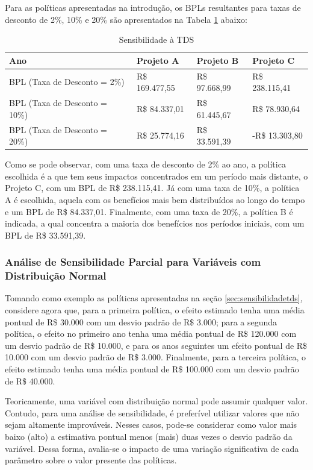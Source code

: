 \documentclass[12pt,letterpaper]{article}
\newcommand{\1}{\mathbbm{1}}
\numberwithin{equation}{section}
\begin{document}
Para as políticas apresentadas na introdução, os BPLs resultantes para taxas de desconto de 2\%, 10\% e 20\% são apresentados na Tabela \ref{tab:sensibilidadetds} abaixo:

\begin{table}[htbp]
  \centering
  \caption{Sensibilidade à TDS}
    \begin{tabular}{|l|l|l|l|}
    \toprule
    Ano   & Projeto A & Projeto B & Projeto C \\
    \midrule
    BPL (Taxa de Desconto = 2\%) &  R\$  169.477,55  &  R\$    97.668,99  &  R\$  238.115,41  \\
    \midrule
    BPL (Taxa de Desconto = 10\%) &  R\$    84.337,01  &  R\$    61.445,67  &  R\$    78.930,64  \\
    \midrule
    BPL (Taxa de Desconto = 20\%) &  R\$    25.774,16  &  R\$    33.591,39  & -R\$    13.303,80  \\
    \bottomrule
    \end{tabular}%
  \label{tab:sensibilidadetds}%
\end{table}%

Como se pode observar, com uma taxa de desconto de 2\% ao ano, a política escolhida é a que tem seus impactos concentrados em um período mais distante, o Projeto C, com um BPL de R\$ 238.115,41. Já com uma taxa de 10\%, a política A é escolhida, aquela com os benefícios mais bem distribuídos ao longo do tempo e um BPL de R\$ 84.337,01. Finalmente, com uma taxa de 20\%, a política B é indicada, a qual concentra a maioria dos benefícios nos períodos iniciais, com um BPL de R\$ 33.591,39.

\subsubsection{Análise de Sensibilidade Parcial para Variáveis com Distribuição Normal}

Tomando como exemplo as políticas apresentadas na seção \ref{sec:sensibilidadetds}, considere agora que, para a primeira política, o efeito estimado tenha uma média pontual de R\$ 30.000 com um desvio padrão de R\$ 3.000; para a segunda política, o efeito no primeiro ano tenha uma média pontual de R\$ 120.000 com um desvio padrão de R\$ 10.000, e para os anos seguintes um efeito pontual de R\$ 10.000 com um desvio padrão de R\$ 3.000. Finalmente, para a terceira política, o efeito estimado tenha uma média pontual de R\$ 100.000 com um desvio padrão de R\$ 40.000.

Teoricamente, uma variável com distribuição normal pode assumir qualquer valor. Contudo, para uma análise de sensibilidade, é preferível utilizar valores que não sejam altamente improváveis. Nesses casos, pode-se considerar como valor mais baixo (alto) a estimativa pontual menos (mais) duas vezes o desvio padrão da variável. Dessa forma, avalia-se o impacto de uma variação significativa de cada parâmetro sobre o valor presente das políticas.
\end{document}
